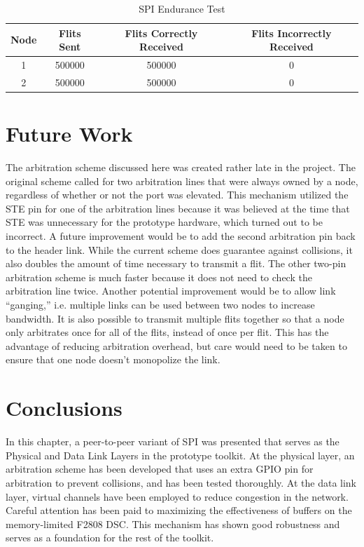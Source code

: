 \begin{table}
	\begin{centering}
		\setlength{\extrarowheight}{1.5pt}
		\caption{SPI Endurance Test}
		\vspace{0.1cm}
		\begin{tabular}{|c|c|c|c|}
			\hline
			\textbf{Node} &	\textbf{Flits Sent} & \textbf{Flits Correctly Received} & \textbf{Flits Incorrectly Received} \\
			\hline
			\hline
	       1 & 500000 & 500000 & 0 \\
	       \hline
	       2 & 500000 & 500000 & 0 \\
	       \hline
		\end{tabular}
		\label{tab:spi:endurance_test}
	\end{centering}
\end{table}
		
\section{Future Work}\label{sec:spi:future_work}

The arbitration scheme discussed here was created rather late in the project. The original scheme called for two arbitration lines that were always owned by a node, regardless of whether or not the port was elevated. This mechanism utilized the STE pin for one of the arbitration lines because it was believed at the time that STE was unnecessary for the prototype hardware, which turned out to be incorrect. A future improvement would be to add the second arbitration pin back to the header link. While the current scheme does guarantee against collisions, it also doubles the amount of time necessary to transmit a flit. The other two-pin arbitration scheme is much faster because it does not need to check the arbitration line twice. Another potential improvement would be to allow link ``ganging,'' i.e. multiple links can be used between two nodes to increase bandwidth. It is also possible to transmit multiple flits together so that a node only  arbitrates once for all of the flits, instead of once per flit. This has the advantage of reducing arbitration overhead, but care would need to be taken to ensure that one node doesn't monopolize the link.

\section{Conclusions}\label{sec:spi:conclusions}

In this chapter, a peer-to-peer variant of SPI was presented that serves as the Physical and Data Link Layers in the prototype toolkit. At the physical layer, an arbitration scheme has been developed that uses an extra GPIO pin for arbitration to prevent collisions, and has been tested thoroughly. At the data link layer, virtual channels have been employed to reduce congestion in the network. Careful attention has been paid to maximizing the effectiveness of buffers on the memory-limited F2808 DSC. This mechanism has shown good robustness and serves as a foundation for the rest of the toolkit.